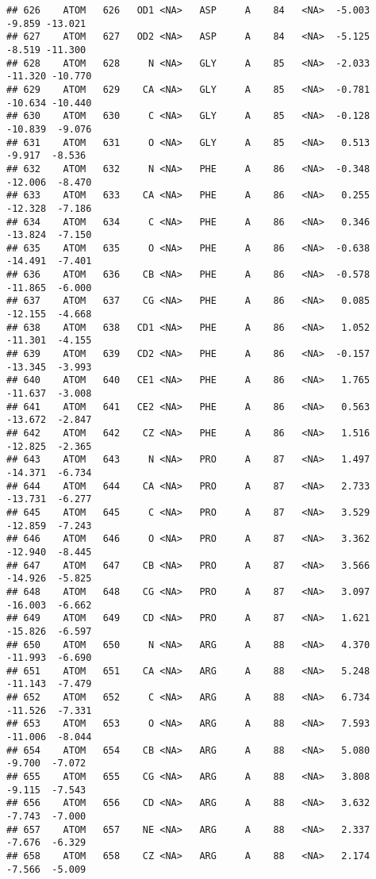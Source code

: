 \documentclass[
]{article}
\begin{document}
\begin{verbatim}
## 626    ATOM   626   OD1 <NA>   ASP     A    84   <NA>  -5.003  -9.859 -13.021
## 627    ATOM   627   OD2 <NA>   ASP     A    84   <NA>  -5.125  -8.519 -11.300
## 628    ATOM   628     N <NA>   GLY     A    85   <NA>  -2.033 -11.320 -10.770
## 629    ATOM   629    CA <NA>   GLY     A    85   <NA>  -0.781 -10.634 -10.440
## 630    ATOM   630     C <NA>   GLY     A    85   <NA>  -0.128 -10.839  -9.076
## 631    ATOM   631     O <NA>   GLY     A    85   <NA>   0.513  -9.917  -8.536
## 632    ATOM   632     N <NA>   PHE     A    86   <NA>  -0.348 -12.006  -8.470
## 633    ATOM   633    CA <NA>   PHE     A    86   <NA>   0.255 -12.328  -7.186
## 634    ATOM   634     C <NA>   PHE     A    86   <NA>   0.346 -13.824  -7.150
## 635    ATOM   635     O <NA>   PHE     A    86   <NA>  -0.638 -14.491  -7.401
## 636    ATOM   636    CB <NA>   PHE     A    86   <NA>  -0.578 -11.865  -6.000
## 637    ATOM   637    CG <NA>   PHE     A    86   <NA>   0.085 -12.155  -4.668
## 638    ATOM   638   CD1 <NA>   PHE     A    86   <NA>   1.052 -11.301  -4.155
## 639    ATOM   639   CD2 <NA>   PHE     A    86   <NA>  -0.157 -13.345  -3.993
## 640    ATOM   640   CE1 <NA>   PHE     A    86   <NA>   1.765 -11.637  -3.008
## 641    ATOM   641   CE2 <NA>   PHE     A    86   <NA>   0.563 -13.672  -2.847
## 642    ATOM   642    CZ <NA>   PHE     A    86   <NA>   1.516 -12.825  -2.365
## 643    ATOM   643     N <NA>   PRO     A    87   <NA>   1.497 -14.371  -6.734
## 644    ATOM   644    CA <NA>   PRO     A    87   <NA>   2.733 -13.731  -6.277
## 645    ATOM   645     C <NA>   PRO     A    87   <NA>   3.529 -12.859  -7.243
## 646    ATOM   646     O <NA>   PRO     A    87   <NA>   3.362 -12.940  -8.445
## 647    ATOM   647    CB <NA>   PRO     A    87   <NA>   3.566 -14.926  -5.825
## 648    ATOM   648    CG <NA>   PRO     A    87   <NA>   3.097 -16.003  -6.662
## 649    ATOM   649    CD <NA>   PRO     A    87   <NA>   1.621 -15.826  -6.597
## 650    ATOM   650     N <NA>   ARG     A    88   <NA>   4.370 -11.993  -6.690
## 651    ATOM   651    CA <NA>   ARG     A    88   <NA>   5.248 -11.143  -7.479
## 652    ATOM   652     C <NA>   ARG     A    88   <NA>   6.734 -11.526  -7.331
## 653    ATOM   653     O <NA>   ARG     A    88   <NA>   7.593 -11.006  -8.044
## 654    ATOM   654    CB <NA>   ARG     A    88   <NA>   5.080  -9.700  -7.072
## 655    ATOM   655    CG <NA>   ARG     A    88   <NA>   3.808  -9.115  -7.543
## 656    ATOM   656    CD <NA>   ARG     A    88   <NA>   3.632  -7.743  -7.000
## 657    ATOM   657    NE <NA>   ARG     A    88   <NA>   2.337  -7.676  -6.329
## 658    ATOM   658    CZ <NA>   ARG     A    88   <NA>   2.174  -7.566  -5.009

\end{verbatim}
\end{document}
